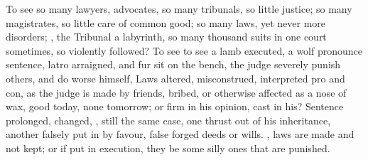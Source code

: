 {To see so many lawyers, advocates, so many tribunals, so little
justice; so many magistrates, so little care of common good; so many
laws, yet never more disorders; , the Tribunal a
labyrinth, so many thousand suits in one court sometimes, so violently
followed? To see  to see a lamb executed, a wolf pronounce sentence,
latro arraigned, and fur sit on the bench, the judge severely punish
others, and do worse himself,   Laws altered,
misconstrued, interpreted pro and con, as the judge is made by
friends, bribed, or otherwise affected as a nose of wax, good today,
none tomorrow; or firm in his opinion, cast in his? Sentence prolonged,
changed, , still the same case, one thrust out
of his inheritance, another falsely put in by favour, false forged
deeds or wills. , laws are made and not kept;
or if put in execution, they be some silly ones that are punished.

}
